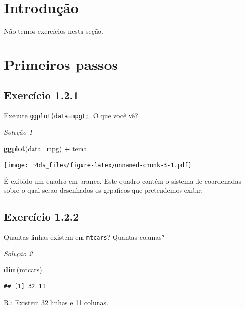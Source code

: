 \documentclass[
]{latex/krantz}
\newenvironment{Shaded}{\begin{snugshade}}{\end{snugshade}}
\newcommand{\AttributeTok}[1]{\textcolor[rgb]{0.13,0.29,0.53}{#1}}
\newcommand{\FunctionTok}[1]{\textcolor[rgb]{0.13,0.29,0.53}{\textbf{#1}}}
\newcommand{\NormalTok}[1]{#1}
\newcommand{\SpecialCharTok}[1]{\textcolor[rgb]{0.81,0.36,0.00}{\textbf{#1}}}
\theoremstyle{definition}
\theoremstyle{definition}
\theoremstyle{definition}
\theoremstyle{definition}
\theoremstyle{remark}
\newtheorem*{solution}{Solução}
\begin{document}
\hypertarget{introduuxe7uxe3o}{%
\section{Introdução}\label{introduuxe7uxe3o}}

Não temos exercícios nesta seção.

\hypertarget{primeiros-passos}{%
\section{Primeiros passos}\label{primeiros-passos}}

\hypertarget{exr1-2-1}{%
\subsection*{Exercício 1.2.1}\label{exr1-2-1}}

Execute \texttt{ggplot(data=mpg);}. O que você vê?

\begin{solution}
\leavevmode

\begin{Shaded}
\begin{Highlighting}[]
\FunctionTok{ggplot}\NormalTok{(}\AttributeTok{data=}\NormalTok{mpg) }\SpecialCharTok{+}
\NormalTok{    tema}
\end{Highlighting}
\end{Shaded}

\texttt{[image: r4ds\_files/figure-latex/unnamed-chunk-3-1.pdf]}

É exibido um quadro em branco. Este quadro contém o sistema de coordenadas sobre o qual serão desenhados os grpaficos que pretendemos exibir.

\end{solution}

\hypertarget{exr1-2-2}{%
\subsection*{Exercício 1.2.2}\label{exr1-2-2}}

Quantas linhas existem em \texttt{mtcars}? Quantas colunas?

\begin{solution}
\leavevmode

\begin{Shaded}
\begin{Highlighting}[]
\FunctionTok{dim}\NormalTok{(mtcars)}
\end{Highlighting}
\end{Shaded}

\begin{verbatim}
## [1] 32 11
\end{verbatim}

R.: Existem 32 linhas e 11 colunas.

\end{solution}
\end{document}
